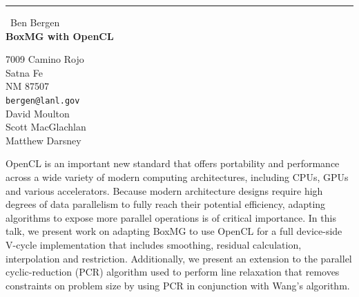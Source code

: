 \documentclass{report}
\begin{document}
\begin{center}
\rule{6in}{1pt} \
{\large Ben Bergen \\
{\bf BoxMG with OpenCL}}

7009 Camino Rojo \\ Satna Fe \\ NM 87507
\\
{\tt bergen@lanl.gov}\\
David Moulton\\
Scott MacGlachlan\\
Matthew Darsney\end{center}

OpenCL is an important new standard that offers portability and
performance across a wide variety of modern computing architectures,
including CPUs, GPUs and various accelerators. Because modern
architecture designs require high degrees of data parallelism to fully
reach their potential efficiency, adapting algorithms to expose more
parallel operations is of critical importance. In this talk, we present
work on adapting BoxMG to use OpenCL for a full device-side V-cycle
implementation that includes smoothing, residual calculation,
interpolation and restriction. Additionally, we present an extension to
the parallel cyclic-reduction (PCR) algorithm used to perform line
relaxation that removes constraints on problem size by using PCR in
conjunction with Wang's algorithm.
\end{document}
